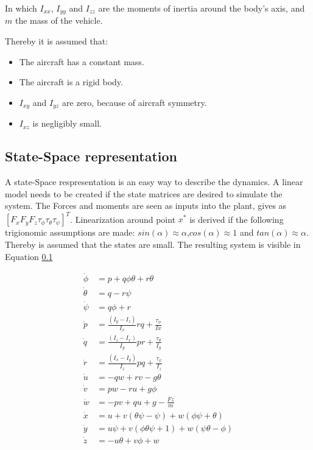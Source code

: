 In which $I_{xx}$, $I_{yy}$ and $I_{zz}$ are the moments of inertia around the body's axis, and $m$ the mass of the vehicle.

Thereby it is assumed that: 
\begin{itemize}
\item The aircraft has a constant mass. \\
\item The aircraft is a rigid body. \\
\item $I_{xy}$ and $I_{yz}$ are zero, because of aircraft symmetry. \\
\item $I_{xz}$ is negligibly small. \\
\end{itemize}


\subsection{State-Space representation}
A state-Space respresentation is an easy way to describe the dynamics. A linear model needs to be created if the state matrices are desired to simulate the system. The Forces and moments are seen as inputs into the plant, gives as $\left[ F_x F_y F_z \tau_{\phi} \tau_{\theta} \tau_{\psi} \right]^T$. Linearization around point $x^*$ is derived if the following trigionomic assumptions are made: $sin(\alpha) \approx \alpha$,$cos(\alpha) \approx 1$ and $tan(\alpha) \approx \alpha$. Thereby is assumed that the states are small. The resulting system is visible in Equation \ref{}

\begin{equation}
\begin{aligned}
\dot{\phi} &= p + q \phi \theta +r \theta \\
\dot{\theta} &= q-r \psi  \\
\dot{\psi} &= q\phi +r \\
\dot{p} &= \frac{(I_y-I_z)}{I_x}rq + \frac{\tau_{\phi}}{Ix} \\
\dot{q} &= \frac{(I_z-I_x)}{I_y}pr + \frac{\tau_{\theta}}{I_y} \\
\dot{r} &= \frac{(I_x-I_y)}{I_z}pq + \frac{\tau_{\psi}}{I_z} \\
\dot{u} &= -qw+rv-g\theta \\
\dot{v} &= pw-ru+g\phi \\
\dot{w} &= -pv+qu+g-\frac{Fz}{m} \\
\dot{x} &= u+v(\theta \psi -\psi) + w(\phi \psi +\theta) \\
\dot{y} &= u\psi + v(\phi\theta\psi+1) + w(\psi\theta -\phi) \\
\dot{z} &= -u\theta +v\phi+w \\
\end{aligned}
\end{equation}


